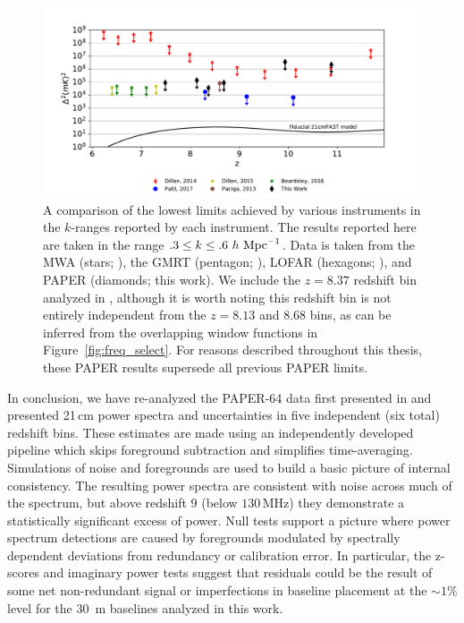 \begin{figure}[tp]
\centering
\includegraphics[width=.95\textwidth]{plots/eor_lowest_limits.pdf}
\caption{A comparison of the lowest limits achieved by various instruments in the $k$-ranges reported by each instrument.
The results reported here are taken in the range
$.3 \leq k \leq .6\ h\ {\rm Mpc}^{-1}$. Data is taken
from the MWA (stars; \cite{dillon_et_al2013b,dillon_et_al2015,beardsley_et_al2016}),
the GMRT (pentagon; \cite{paciga_et_al2013}),
LOFAR (hexagons; \cite{patil_et_al2017}),
and PAPER (diamonds; this work).
We include the $z=8.37$ redshift bin analyzed in \citet{ali_et_al2015}, although
it is worth noting this redshift bin is not entirely independent
from the $z=8.13$ and $8.68$ bins, as can be inferred from the
overlapping window functions in Figure~\ref{fig:freq_select}.
For reasons described throughout this thesis,
these PAPER results supersede all previous PAPER limits.
\label{fig:eor_summary}}
\end{figure}

In conclusion, we have re-analyzed the PAPER-64 data first presented in 
 and presented 21\,cm
power spectra and uncertainties in five independent (six total) redshift bins. These estimates
are made using an independently developed pipeline
which skips foreground subtraction and simplifies time-averaging. Simulations
of noise and foregrounds are used to build a basic picture of
internal consistency. The resulting power spectra are consistent with noise
across much of the spectrum, but above redshift $9$ (below $130$\,MHz) they demonstrate
a statistically significant excess of power. Null tests support a picture where
power spectrum detections are caused by foregrounds modulated by
spectrally dependent deviations from redundancy or calibration error.
In particular, the z-scores and imaginary power tests suggest that residuals
could be the result of some net non-redundant signal
or imperfections in baseline placement at the
$ \sim 1\% $ level for the $ 30 $~m baselines
analyzed in this work.

